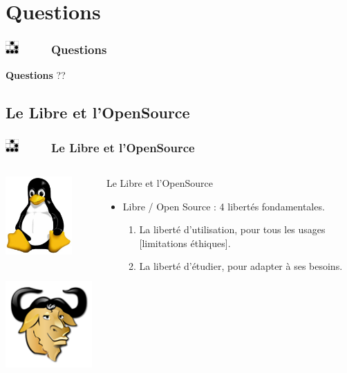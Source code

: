 \documentclass[slidetop,11pt]{beamer}
\def\sectionPartIV{Questions}
\def\sectionPartIVa{Le Libre et l'OpenSource}
\def\moreInFrameTitle{\includegraphics[height=0.5cm]{img/logo_glider.png}~~~~~}
\begin{document}
\section{\sectionPartIV}
\begin{frame}
	\frametitle{\moreInFrameTitle \sectionPartIV}
	{\centering \textbf{Questions} ?? }
\end{frame} 

\subsection{\sectionPartIVa}
\begin{frame}
	\frametitle{\moreInFrameTitle \sectionPartIVa}
	\begin{footnotesize}
	\begin{columns}[T]
	\begin{column}[T]{5cm}
		\includegraphics[height=3cm]{img/tux.png}~\\~\\
		\includegraphics[height=4cm]{img/Nuvola_apps_emacs.png}~\\~\\
	\end{column}
	\begin{column}[T]{7cm}
		\begin{beamerboxesrounded}	[lower=substructureDE, %
		 				 upper=block title DE,%
						 shadow=true]%
		       {\sectionPartIVa}
			\begin{itemize}
				\item Libre / Open Source : 4 libert{\'e}s fondamentales. 
				\begin{enumerate}
					\item La libert{\'e} d'utilisation, pour tous les usages [limitations {\'e}thiques]. 
					\item La libert{\'e} d'{\'e}tudier, pour adapter {\`a} ses besoins. 

\end{enumerate}
\end{itemize}
\end{beamerboxesrounded}
\end{column}
\end{columns}
\end{footnotesize}
\end{frame}
\end{document}
